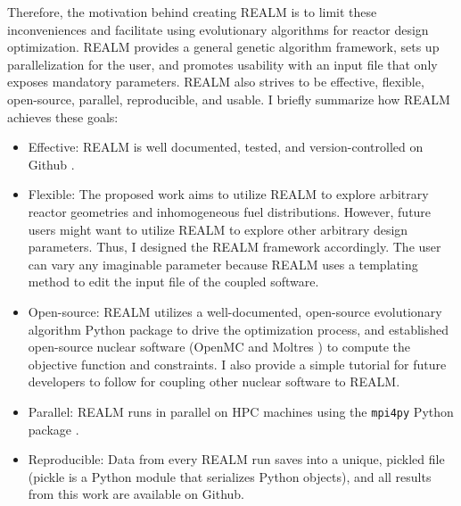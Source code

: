Therefore, the motivation behind creating \gls{REALM} is to limit these inconveniences and 
facilitate using evolutionary algorithms for reactor design optimization.
\gls{REALM} provides a general genetic algorithm framework, sets up 
parallelization for the user, and promotes usability with an input file 
that only exposes mandatory parameters.
REALM also strives to be effective, flexible, open-source, parallel, reproducible, 
and usable. 
I briefly summarize how \gls{REALM} achieves these goals:  
\begin{itemize}
    \item Effective: \gls{REALM} is well documented, tested, and 
    version-controlled on Github \cite{chee_arfcrealm_2021}.
    \item Flexible: The proposed work aims to utilize \gls{REALM} to 
    explore arbitrary reactor geometries and inhomogeneous fuel distributions. 
    However, future users might want to utilize \gls{REALM} 
    to explore other arbitrary design parameters. Thus, I designed the \gls{REALM}
    framework accordingly. The user can vary any imaginable parameter 
    because \gls{REALM} uses a templating method to edit the input file of the 
    coupled software.
    \item Open-source: \gls{REALM} utilizes a well-documented, open-source 
    evolutionary algorithm Python package to drive the optimization process, 
    and established open-source nuclear software (OpenMC \cite{romano_openmc_2013} and 
    Moltres \cite{lindsay_introduction_2018}) to compute the objective function 
    and constraints. I also provide a simple tutorial for future developers to 
    follow for coupling other nuclear software to \gls{REALM}.  
    \item Parallel: \gls{REALM} runs in parallel on \gls{HPC} machines using the 
    \texttt{mpi4py} Python package \cite{dalcin_mpi_2008}.
    \item Reproducible: Data from every \gls{REALM} run saves into a unique, pickled 
    file (pickle is a Python module that serializes Python objects), and all 
    results from this work are available on Github. 
\end{itemize}

